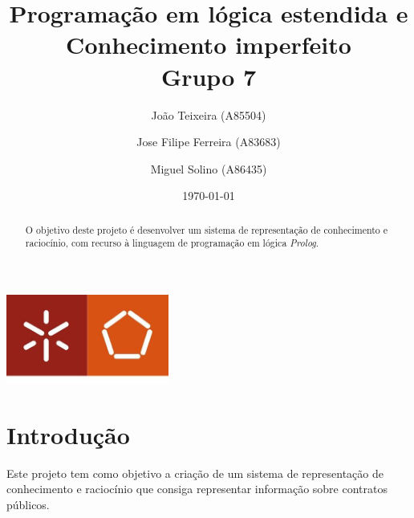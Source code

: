 \documentclass[a4paper]{report}
\begin{document}
\title{Programação em lógica estendida e Conhecimento imperfeito \\
\large Grupo 7}
\author{João Teixeira (A85504) \and Jose Filipe Ferreira (A83683) \and Miguel
Solino (A86435)}
\date{\today}

\begin{center}
    \begin{minipage}{0.75\linewidth}
        \centering
        \includegraphics[width=0.4\textwidth]{eng.jpeg}\par\vspace{1cm}
        \vspace{1.5cm}
        \href{https://www.uminho.pt/PT}
        {\color{black}{\scshape\LARGE Universidade do Minho}} \par
        \vspace{1cm}
        \href{https://www.di.uminho.pt/}
        {\color{black}{\scshape\Large Departamento de Informática}} \par
        \vspace{1.5cm}
        \maketitle
    \end{minipage}
\end{center}

\begin{abstract}
    \begin{center}
        O objetivo deste projeto é desenvolver um sistema de representação de
        conhecimento e raciocínio, com recurso à linguagem de programação em
        lógica \textit{Prolog}.
    \end{center}
\end{abstract}

\tableofcontents

\pagebreak

\chapter{Introdução}
Este projeto tem como objetivo a criação de um sistema de representação de
conhecimento e raciocínio que consiga representar informação sobre contratos
públicos.
\end{document}
